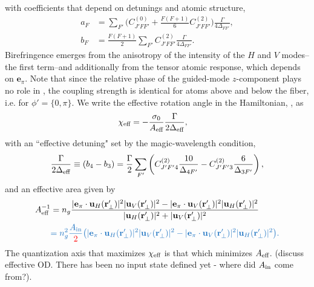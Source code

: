 \documentclass[preprint,aps,pra,onecolumn]{revtex4-1} %
\newcommand{\inp}{{\rm in}}
\newcommand{\change}[1]{{\color{RoyalBlue} #1}}
\newcommand{\comment}[1]{{\color{Maroon} #1}}
\newcommand{\error}[1]{{\color{red} #1}}
\begin{document}
with coefficients that depend on detunings and atomic structure,
	\begin{align}
		a_F &= \sum_{F'}  \Big(C^{(0)}_{J'FF'} + \frac{F(F+1)}{6} C^{(2)}_{J'FF'} \Big) \frac{\Gamma}{4 \Delta_{FF'}},\\
		b_F &= \frac{F(F+1)}{2}\sum_{F'} C^{(2)}_{J'FF'}  \frac{\Gamma}{4 \Delta_{FF'}}.
	\end{align}
Birefringence emerges from the anisotropy of the intensity of the $H$ and $V$ modes--the first term--and additionally from the tensor atomic response, which depends on $\mathbf{e}_\pi$.  Note that since the relative phase of the guided-mode $z$-component plays no role in , the coupling strength is identical for atoms above and below the fiber, i.e. for $\phi' = \{0,\pi\}$.  We write the effective rotation angle in the Hamiltonian, , as
	\begin{align} \label{Eq::chieff}
		\chi_{\eff} %
			& = - \frac{\sigma_0}{A_{\eff}} \frac{\Gamma}{ 2 \Delta_{\eff}},
	\end{align}
with an ``effective detuning" set by the magic-wavelength condition,
	\begin{align} 
		\frac{\Gamma}{2 \Delta_{\text{eff}}} \equiv (b_4 - b_3) =  \frac{\Gamma}{2} \sum_{F'}  \left( C^{(2)}_{J'F'4}\frac{10}{\Delta_{4F'}} -  C^{(2)}_{J'F'3}\frac{6}{ \Delta_{3F'} } \right),
	\end{align}
and an effective area given by
	\begin{align}
		A_{\eff}^{-1} & = n_g \frac{ |\mathbf{e}_\pi \cdot \mathbf{u}_H(\br'_\perp) |^2 |\mathbf{u}_V(\br'_\perp)|^2 - |\mathbf{e}_\pi \cdot \mathbf{u}_V(\br'_\perp)|^2 |\mathbf{u}_H(\br'_\perp)|^2}{ |\mathbf{u}_H(\br'_\perp)|^2 + |\mathbf{u}_V(\br'_\perp)|^2 } \\
		& \change{ = n^2_g \frac{A_\inp}{\error{2}} \big( |\mathbf{e}_\pi \cdot \mathbf{u}_H(\br'_\perp) |^2 |\mathbf{u}_V(\br'_\perp)|^2 - |\mathbf{e}_\pi \cdot \mathbf{u}_V(\br'_\perp)|^2 |\mathbf{u}_H(\br'_\perp)|^2 \big). }
	\end{align}	
The quantization axis that maximizes $\chi_{\text{eff}}$ is that which minimizes $A_{\text{eff}}$.  \comment{(discuss effective OD. There has been no input state defined yet - where did $A_\inp$ come from?)}.
\end{document}
